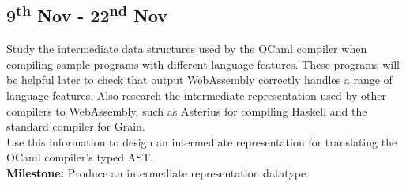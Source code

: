 \documentclass[12pt]{article}
\begin{document}



\subsection*{9\textsuperscript{th} Nov - 22\textsuperscript{nd} Nov}%
Study the intermediate data structures used by the OCaml compiler when compiling sample programs with different language features. These programs will be helpful later to check that output WebAssembly correctly handles a range of language features. Also research the intermediate representation used by other compilers to WebAssembly, such as Asterius for compiling Haskell and the standard compiler for Grain. \\ %
Use this information to design an intermediate representation for translating the OCaml compiler's typed AST. \\
\textbf{Milestone: }Produce an intermediate representation datatype. %

\end{document}
